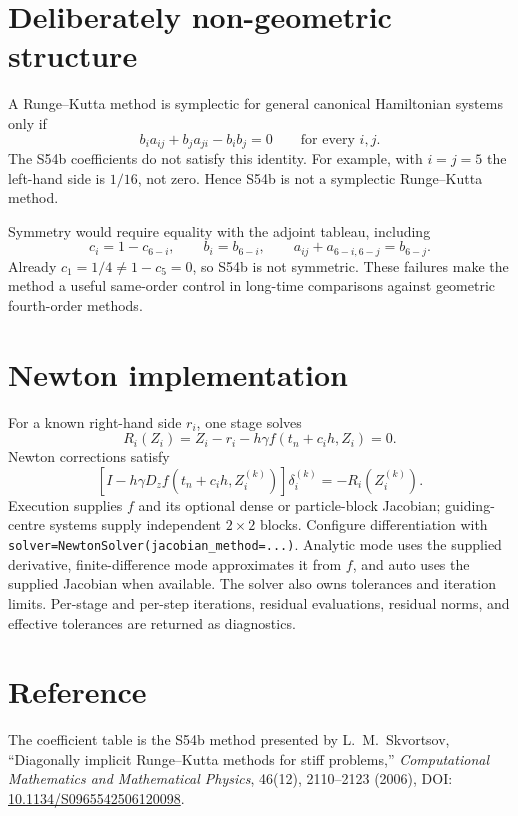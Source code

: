 \documentclass[11pt,a4paper]{article}
\begin{document}
\section{Deliberately non-geometric structure}

A Runge--Kutta method is symplectic for general canonical Hamiltonian systems
only if
\[
 b_i a_{ij}+b_j a_{ji}-b_i b_j=0
 \qquad\text{for every }i,j.
\]
The S54b coefficients do not satisfy this identity.  For example, with
$i=j=5$ the left-hand side is $1/16$, not zero.  Hence S54b is not a
symplectic Runge--Kutta method.

Symmetry would require equality with the adjoint tableau, including
\[
 c_i=1-c_{6-i},\qquad b_i=b_{6-i},\qquad
 a_{ij}+a_{6-i,6-j}=b_{6-j}.
\]
Already $c_1=1/4\ne 1-c_5=0$, so S54b is not symmetric.  These failures make
the method a useful same-order control in long-time comparisons against
geometric fourth-order methods.

\section{Newton implementation}

For a known right-hand side $r_i$, one stage solves
\[
 R_i(Z_i)=Z_i-r_i-h\gamma f(t_n+c_ih,Z_i)=0.
\]
Newton corrections satisfy
\[
 \left[I-h\gamma D_zf(t_n+c_ih,Z_i^{(k)})\right]\delta_i^{(k)}
 =-R_i(Z_i^{(k)}).
\]
Execution supplies $f$ and its optional dense or particle-block Jacobian;
guiding-centre systems supply independent $2\times2$ blocks.
Configure differentiation with \texttt{solver=NewtonSolver(}\allowbreak\texttt{jacobian\_method=...)}.
Analytic mode uses the supplied derivative, finite-difference mode approximates
it from $f$, and auto uses the supplied Jacobian when available. The solver also
owns tolerances and iteration limits. Per-stage and per-step iterations,
residual evaluations, residual norms, and effective tolerances are returned as
diagnostics.

\section{Reference}

The coefficient table is the S54b method presented by L.~M.~Skvortsov,
``Diagonally implicit Runge--Kutta methods for stiff problems,''
\emph{Computational Mathematics and Mathematical Physics}, 46(12),
2110--2123 (2006), DOI:
\href{https://doi.org/10.1134/S0965542506120098}{10.1134/S0965542506120098}.
\end{document}
